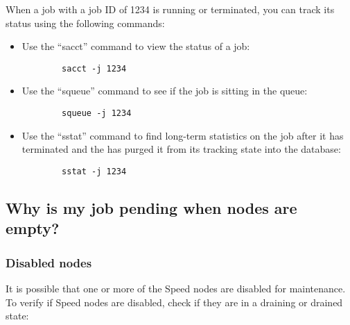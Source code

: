 When a job with a job ID of 1234 is running or terminated, 
you can track its status using the following commands:
\begin{itemize}
	\item Use the ``sacct'' command to view the status of a job:
	\begin{verbatim} 
		sacct -j 1234
	\end{verbatim}
	\item Use the ``squeue'' command to see if the job is sitting in the queue:
	\begin{verbatim} 
		squeue -j 1234
	\end{verbatim}
	\item Use the ``sstat'' command to find long-term statistics on the job after it has terminated 
	and the  has purged it from its tracking state into the database:
	\begin{verbatim} 
		sstat -j 1234
	\end{verbatim}
\end{itemize}

\subsection{Why is my job pending when nodes are empty?}

\subsubsection{Disabled nodes}

It is possible that one or more of the Speed nodes are disabled for maintenance.
To verify if Speed nodes are disabled, check if they are in a draining or drained state:

